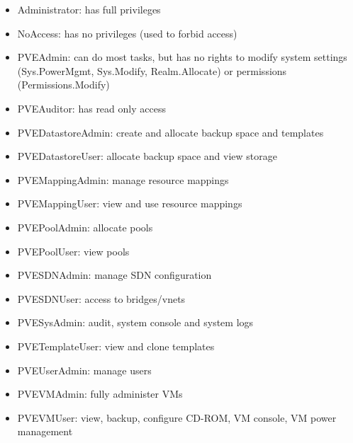 \begin{itemize}[leftmargin=2cm]

	\item Administrator: has full privileges

	\item NoAccess: has no privileges (used to forbid access)

	\item PVEAdmin: can do most tasks, but has no rights to modify system settings (Sys.PowerMgmt, Sys.Modify, Realm.Allocate) or permissions (Permissions.Modify)

	\item PVEAuditor: has read only access

	\item PVEDatastoreAdmin: create and allocate backup space and templates

	\item PVEDatastoreUser: allocate backup space and view storage

	\item PVEMappingAdmin: manage resource mappings

	\item PVEMappingUser: view and use resource mappings

	\item PVEPoolAdmin: allocate pools

	\item PVEPoolUser: view pools

	\item PVESDNAdmin: manage SDN configuration

	\item PVESDNUser: access to bridges/vnets

	\item PVESysAdmin: audit, system console and system logs

	\item PVETemplateUser: view and clone templates

	\item PVEUserAdmin: manage users

	\item PVEVMAdmin: fully administer VMs

	\item PVEVMUser: view, backup, configure CD-ROM, VM console, VM power management

\end{itemize}

